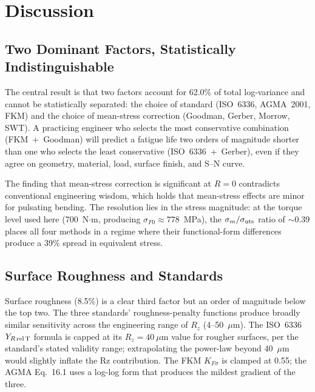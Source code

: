\documentclass[12pt,a4paper]{article}
\begin{document}
\section{Discussion}
\label{sec:discussion}

\subsection{Two Dominant Factors, Statistically Indistinguishable}

The central result is that two factors account for 62.0\% of total
log-variance and cannot be statistically separated: the choice of
standard (ISO~6336, AGMA~2001, FKM) and the choice of mean-stress
correction (Goodman, Gerber, Morrow, SWT). A practicing engineer who
selects the most conservative combination (FKM~+~Goodman) will predict a
fatigue life two orders of magnitude shorter than one who selects the
least conservative (ISO~6336~+~Gerber), even if they agree on geometry,
material, load, surface finish, and S--N curve.

The finding that mean-stress correction is significant at $R=0$
contradicts conventional engineering wisdom, which holds that
mean-stress effects are minor for pulsating bending. The resolution lies
in the stress magnitude: at the torque level used here (700~N$\cdot$m,
producing $\sigma_{F0} \approx 778$~MPa), the $\sigma_m/\sigma_{\rm uts}$
ratio of $\sim$0.39 places all four methods in a regime where their
functional-form differences produce a 39\% spread in equivalent stress.

\subsection{Surface Roughness and Standards}

Surface roughness (8.5\%) is a clear third factor but an order of
magnitude below the top two. The three standards' roughness-penalty
functions produce broadly similar sensitivity across the engineering
range of $R_z$ (4--50~$\mu$m). The ISO~6336 $Y_{R\,\rm rel\,T}$ formula
is capped at its $R_z=40~\mu$m value for rougher surfaces, per the
standard's stated validity range; extrapolating the power-law beyond
40~$\mu$m would slightly inflate the Rz contribution. The FKM $K_{F\sigma}$
is clamped at 0.55; the AGMA Eq.~16.1 uses a log-log form that produces
the mildest gradient of the three.
\end{document}

